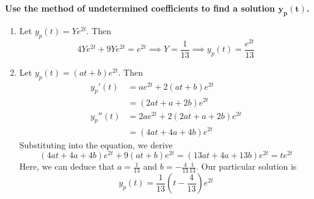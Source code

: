 \documentclass[a4paper]{article}
\begin{document}
\vspace{12pt}

\textbf{Use the method of undetermined coefficients to find a solution \( \pmb{y_{p } \!\left( t  \right)} \).}

\vspace{12pt}


\begin{enumerate}[label=(\alph*)]
	\item Let \( y_{p } \!\left( t  \right) = Ye^{2t} \). Then
	\[
		4Ye^{2t} + 9Ye^{2t} = e^{2t} \implies Y = \frac{1}{13} \implies y_{p } \!\left( t  \right) = \frac{e^{2t}}{13}
	\]
	\item Let \( y_{p } \!\left( t  \right) = \!\left( at + b  \right)e^{2t} \). Then 
	\begin{align*}
		y_{p }' \!\left( t  \right) & = ae^{2t} + 2 \!\left( at + b  \right)e^{2t} \\
					    & = \!\left( 2at + a + 2b \right)e^{2t} \\ 
		y_{p }''\!\left( t  \right) & = 2ae^{2t} + 2 \!\left( 2at + a + 2b \right)e^{2t} \\
					    & = \!\left( 4at + 4a + 4b \right)e^{2t}
	\end{align*}
	Substituting into the equation, we derive
	\[
		\!\left( 4at + 4a + 4b \right)e^{2t} + 9 \!\left( at + b  \right)e^{2t} = \!\left( 13at  + 4a + 13b \right)e^{2t} = te^{2t}
	\]
	Here, we can deduce that \( a = \displaystyle{\frac{1}{13}} \) and \( b = \displaystyle{-\frac{4}{13}\frac{1}{13}} \). Our particular solution is
	\[
		y_{p } \!\left( t  \right) = \frac{1}{13}\!\left( t - \frac{4}{13} \right)e^{2t} 
	\]
\end{enumerate}

\end{document}
